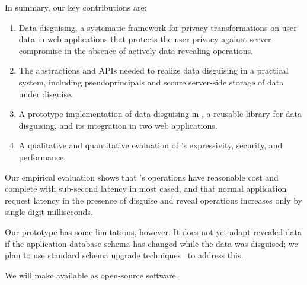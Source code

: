 %
%
In summary, our key contributions are:
%
\begin{enumerate}[nosep]
 \item Data disguising, a systematic framework for privacy transformations on
   user data in web applications that protects the user privacy against server
   compromise in the absence of actively data-revealing operations.
 \item The abstractions and APIs needed to realize data disguising in a
  practical system, including pseudoprincipals and secure server-side storage
  of data under disguise.
 \item A prototype implementation of data disguising in \sys, a reusable
  library for data disguising, and its integration in two web applications.
 \item A qualitative and quantitative evaluation of \sys's expressivity,
  security, and performance.
\end{enumerate}
%
Our empirical evaluation shows that \sys's operations have reasonable cost
and complete with sub-second latency in most cased, and that normal application
request latency in the presence of disguise and reveal operations increases
only by single-digit milliseconds.
%

%
%
Our prototype has some limitations, however.
%
%
It does not yet adapt revealed data if the application database schema has
changed while the data was disguised; we plan to use standard schema upgrade
techniques~\cite{hotcrp-autoupgrade, f1-schema-change,
automated-schema-evol-prism} to address this.
%

%
We will make \sys available as open-source software.
%


